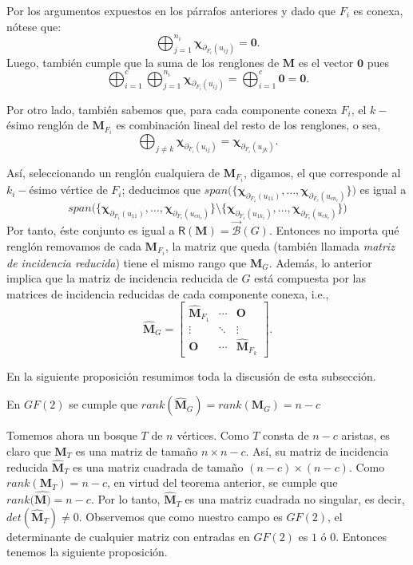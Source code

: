 Por los argumentos expuestos en los párrafos anteriores y dado que $F_{i}$ es conexa, nótese que:
$$
\bigoplus_{j=1}^{n_{i}} \boldsymbol{\chi}_{\partial_{F_{i}}(u_{ij})} = \mathbf{0}.
$$
Luego, también cumple que la suma de los renglones de $\mathbf{M}$ es el vector $\mathbf{0}$ pues
$$
    \bigoplus_{i=1}^{c} \bigoplus_{j=1}^{n_{i}} \boldsymbol{\chi}_{\partial_{F_{i}}(u_{ij})} = \bigoplus_{i=1}^{c} \mathbf{0} = \mathbf{0}.
$$

Por otro lado, también sabemos que, para cada componente conexa $F_{i}$, el $k-$ésimo renglón de $\mathbf{M}_{F_{i}}$ es combinación lineal del resto de los renglones, o sea, $$\bigoplus_{j\neq k} \boldsymbol{\chi}_{\partial_{F_{i}}(u_{ij})} = \boldsymbol{\chi}_{\partial_{F_{i}}(u_{jk})}.$$

Así, seleccionando un renglón cualquiera de $\mathbf{M}_{F_{i}}$, digamos, el que corresponde al $k_{i}-$ésimo vértice de $F_{i}$; deducimos que $span\Big(\{\boldsymbol{\chi}_{\partial_{F_{1}}(u_{11})}, \ldots,  \boldsymbol{\chi}_{\partial_{F_{c}}(u_{cn_{c}})} \}\Big)$ es igual a 
$$ 
     span\Big (\{\boldsymbol{\chi}_{\partial_{F_{1}}(u_{11})}, \ldots,  \boldsymbol{\chi}_{\partial_{F_{c}}(u_{cn_{c}})}\} \setminus \{\boldsymbol{\chi}_{\partial_{F_{1}}(u_{1k_{1}})}, \ldots, \boldsymbol{\chi}_{\partial_{F_{c}}(u_{ck_{c}})} \}\Big )
$$
Por tanto, éste conjunto es igual a $\mathsf{R}(\mathbf{M}) = \overrightarrow{\mathcal{B}}(G).$ Entonces no importa qué renglón removamos de cada $\mathbf{M}_{F_{i}}$, la matriz que queda (también llamada \textit{matriz de incidencia reducida}) tiene el mismo rango que $\mathbf{M}_{G}$. Además, lo anterior implica que la matriz de incidencia reducida de $G$ está compuesta por las matrices de incidencia reducidas de cada componente conexa, i.e., 
$$
\widehat{\mathbf{M}}_{G} = \begin{bmatrix}
\widehat{\mathbf{M}}_{F_{1}} & \cdots & \mathbf{O} \\ 
\vdots & \ddots & \vdots \\ 
\mathbf{O} & \cdots &  \widehat{\mathbf{M}}_{F_{k}}
\end{bmatrix}.
$$

 En la siguiente proposición resumimos toda la discusión de esta subsección.

\begin{prop} \label{prop:rango}
En $GF(2)$ se cumple que $rank(\widehat{\mathbf{M}}_{G}) = rank(\mathbf{M}_{G})= n-c$
\end{prop}

Tomemos ahora un bosque $T$ de $n$ vértices. Como $T$ consta de $n-c$ aristas, es claro que $\mathbf{M}_{T}$ es una matriz de tamaño $n \times n-c$. Así, su matriz de incidencia reducida $\widehat{\mathbf{M}}_{T}$ es una matriz cuadrada de tamaño $(n-c) \times (n-c)$. Como $rank(\mathbf{M}_{T}) = n-c$, en virtud del teorema anterior, se cumple que $rank(\widehat{\mathbf{M})} = n-c$. Por lo tanto, $\widehat{\mathbf{M}}_{T}$ es una matriz cuadrada no singular, es decir, $det(\widehat{\mathbf{M}}_{T}) \neq 0$. Observemos que como nuestro campo es $GF(2)$, el determinante de cualquier matriz con entradas en $GF(2)$ es $1$ ó $0$. Entonces tenemos la siguiente proposición.

